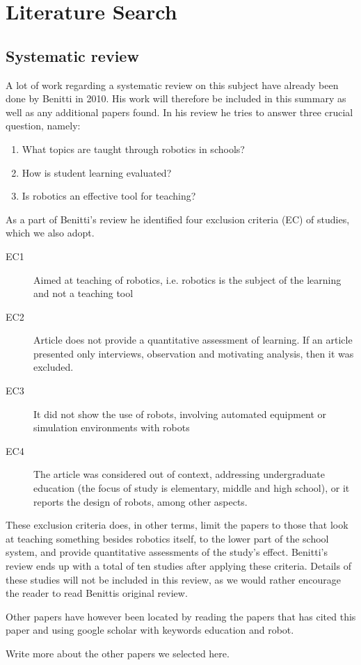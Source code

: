 \section*{Literature Search}
\subsection*{Systematic review}
A lot of work regarding a systematic review on this subject have already been done by Benitti\cite{Benitti2012978} in 2010. His work will therefore be included in this summary as well as any additional papers found. In his review he tries to answer three crucial question, namely: 

\begin{enumerate}
  \item What topics are taught through robotics in schools?
  \item How is student learning evaluated?
  \item Is robotics an effective tool for teaching?
\end{enumerate}

\bigskip\noindent
As a part of Benitti's review he identified four exclusion criteria (EC) of studies, which we also adopt.

\begin{description}
  \item[EC1] Aimed at teaching of robotics, i.e. robotics is the subject of the learning and not a teaching tool
  \item[EC2] Article does not provide a quantitative assessment of learning. If an article presented only interviews, observation and motivating
analysis, then it was excluded.
  \item[EC3] It did not show the use of robots, involving automated equipment or simulation environments with robots
	\item[EC4] The article was considered out of context, addressing undergraduate education (the focus of study is elementary, middle and high
school), or it reports the design of robots, among other aspects.
\end{description}

\bigskip\noindent
These exclusion criteria does, in other terms, limit the papers to those that look at teaching something besides robotics itself, to the lower part of the 
school system, and provide quantitative assessments of the study's effect. 
Benitti's review ends up with a total of ten studies after applying these criteria.
Details of these studies will not be included in this review, as we would rather encourage the reader to read Benittis original review. 

\bigskip\noindent
Other papers have however been located by reading the papers that has cited this paper and using google scholar with keywords education and robot. 

\bigskip\noindent
Write more about the other papers we selected here.

